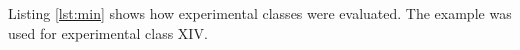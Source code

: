 \label{ch:expsetup}
Listing \ref{lst:min} shows how experimental classes were evaluated. The example was used for experimental class XIV.



